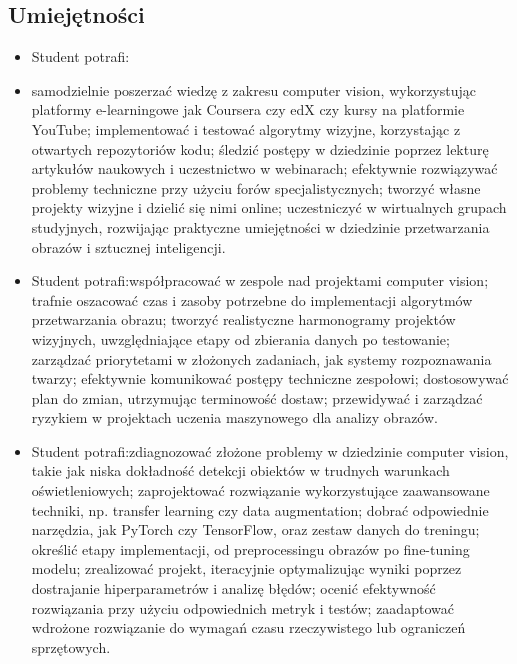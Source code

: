 \documentclass[12pt, a4paper]{article}
\begin{document}
\subsection*{Umiejętności}
\begin{itemize}
  \item Student potrafi:
  \item samodzielnie poszerzać wiedzę z zakresu computer vision, wykorzystując platformy e-learningowe jak Coursera czy edX czy kursy na platformie YouTube; implementować i testować algorytmy wizyjne, korzystając z otwartych repozytoriów kodu; śledzić postępy w dziedzinie poprzez lekturę artykułów naukowych i uczestnictwo w webinarach; efektywnie rozwiązywać problemy techniczne przy użyciu forów specjalistycznych; tworzyć własne projekty wizyjne i dzielić się nimi online; uczestniczyć w wirtualnych grupach studyjnych, rozwijając praktyczne umiejętności w dziedzinie przetwarzania obrazów i sztucznej inteligencji.
  \item Student potrafi:współpracować w zespole nad projektami computer vision; trafnie oszacować czas i zasoby potrzebne do implementacji algorytmów przetwarzania obrazu; tworzyć realistyczne harmonogramy projektów wizyjnych, uwzględniające etapy od zbierania danych po testowanie; zarządzać priorytetami w złożonych zadaniach, jak systemy rozpoznawania twarzy; efektywnie komunikować postępy techniczne zespołowi; dostosowywać plan do zmian, utrzymując terminowość dostaw; przewidywać i zarządzać ryzykiem w projektach uczenia maszynowego dla analizy obrazów.
  \item Student potrafi:zdiagnozować złożone problemy w dziedzinie computer vision, takie jak niska dokładność detekcji obiektów w trudnych warunkach oświetleniowych; zaprojektować rozwiązanie wykorzystujące zaawansowane techniki, np. transfer learning czy data augmentation; dobrać odpowiednie narzędzia, jak PyTorch czy TensorFlow, oraz zestaw danych do treningu; określić etapy implementacji, od preprocessingu obrazów po fine-tuning modelu; zrealizować projekt, iteracyjnie optymalizując wyniki poprzez dostrajanie hiperparametrów i analizę błędów; ocenić efektywność rozwiązania przy użyciu odpowiednich metryk i testów; zaadaptować wdrożone rozwiązanie do wymagań czasu rzeczywistego lub ograniczeń sprzętowych.
\end{itemize}
\end{document}

